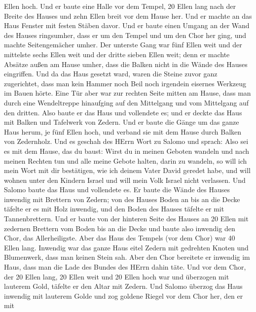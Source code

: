 Ellen hoch.  Und er baute eine Halle vor dem Tempel, 20
Ellen lang nach der Breite des Hauses und zehn Ellen breit vor dem Hause
her.  Und er machte an das Haus Fenster mit festen Stäben
davor.  Und er baute einen Umgang an der Wand des Hauses
ringsumher, dass er um den Tempel und um den Chor her ging, und machte
Seitengemächer umher.  Der unterste Gang war fünf Ellen weit
und der mittelste sechs Ellen weit und der dritte sieben Ellen weit;
denn er machte Absätze außen am Hause umher, dass die Balken nicht in
die Wände des Hauses eingriffen.  Und da das Haus gesetzt
ward, waren die Steine zuvor ganz zugerichtet, dass man kein Hammer noch
Beil noch irgendein eisernes Werkzeug im Bauen hörte.  Eine
Tür aber war zur rechten Seite mitten am Hause, dass man durch eine
Wendeltreppe hinaufging auf den Mittelgang und vom Mittelgang auf den
dritten.  Also baute er das Haus und vollendete es; und er
deckte das Haus mit Balken und Tafelwerk von Zedern.  Und
er baute die Gänge um das ganze Haus herum, je fünf Ellen hoch, und
verband sie mit dem Hause durch Balken von Zedernholz.  Und
es geschah des HErrn Wort zu Salomo und sprach:  Also sei
es mit dem Hause, das du baust: Wirst du in meinen Geboten wandeln und
nach meinen Rechten tun und alle meine Gebote halten, darin zu wandeln,
so will ich mein Wort mit dir bestätigen, wie ich deinem Vater David
geredet habe,  und will wohnen unter den Kindern Israel und
will mein Volk Israel nicht verlassen.  Und Salomo baute
das Haus und vollendete es.  Er baute die Wände des Hauses
inwendig mit Brettern von Zedern; von des Hauses Boden an bis an die
Decke täfelte er es mit Holz inwendig, und den Boden des Hauses täfelte
er mit Tannenbrettern.  Und er baute von der hinteren Seite
des Hauses an 20 Ellen mit zedernen Brettern vom Boden bis an die Decke
und baute also inwendig den Chor, das Allerheiligste.  Aber
das Haus des Tempels (vor dem Chor) war 40 Ellen lang. 
Inwendig war das ganze Haus eitel Zedern mit gedrehten Knoten und
Blumenwerk, dass man keinen Stein sah.  Aber den Chor
bereitete er inwendig im Haus, dass man die Lade des Bundes des HErrn
dahin täte.  Und vor dem Chor, der 20 Ellen lang, 20 Ellen
weit und 20 Ellen hoch war und überzogen mit lauterem Gold, täfelte er
den Altar mit Zedern.  Und Salomo überzog das Haus inwendig
mit lauterem Golde und zog goldene Riegel vor dem Chor her, den er mit
